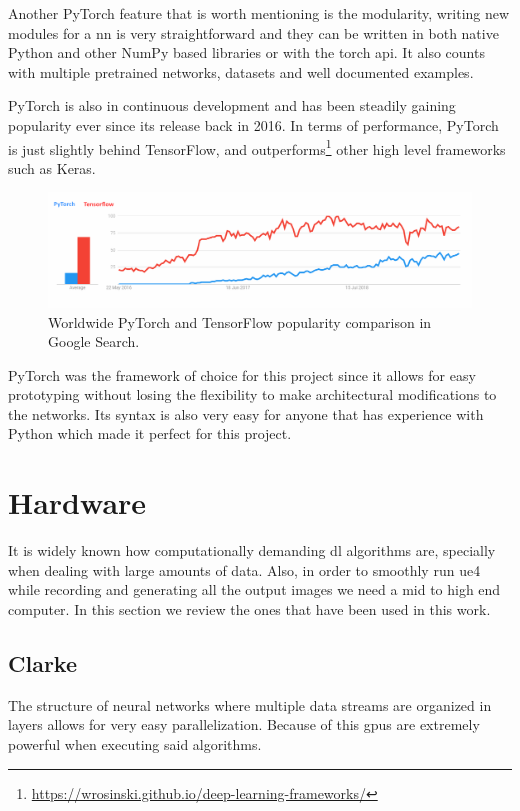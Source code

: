 Another PyTorch feature that is worth mentioning is the modularity, writing new modules for a \gls{nn} is very straightforward and they can be written in both native Python and other NumPy based libraries or with the torch \gls{api}. It also counts with multiple pretrained networks, datasets and well documented examples.

PyTorch is also in continuous development and has been steadily gaining popularity ever since its release back in 2016. In terms of performance, PyTorch is just slightly behind TensorFlow, and outperforms\footnote{\url{https://wrosinski.github.io/deep-learning-frameworks/}} other high level frameworks such as Keras.

\begin{figure}[h]
	\includegraphics[width=\textwidth]{archivos/pytorch.png}
	\centering
	\caption{Worldwide PyTorch and TensorFlow popularity comparison in Google Search.}
	\label{fig:pytorch}
\end{figure}

PyTorch was the framework of choice for this project since it allows for easy prototyping without losing the flexibility to make architectural modifications to the networks. Its syntax is also very easy for anyone that has experience with Python which made it perfect for this project.

\section{Hardware}
\label{sec:hardware}
It is widely known how computationally demanding \gls{dl} algorithms are, specially when dealing with large amounts of data. Also, in order to smoothly run \gls{ue4} while recording and generating all the output images we need a mid to high end computer. In this section we review the ones that have been used in this work.

\subsection{Clarke}

The structure of neural networks where multiple data streams are organized in layers allows for very easy parallelization. Because of this \gls{gpu}s are extremely powerful when executing said algorithms.

